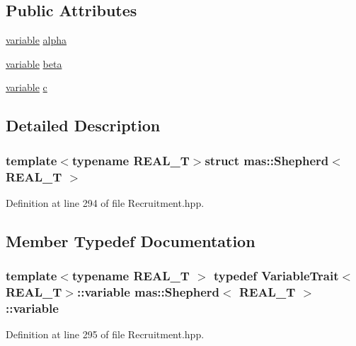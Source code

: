 \subsection*{Public Attributes}
\begin{DoxyCompactItemize}
\item 
\hyperlink{structmas_1_1_shepherd_a5d9d0045570bba5f3450dcedea6a406e}{variable} \hyperlink{structmas_1_1_shepherd_a24f215424f8fe3e38ce0b26fd09628bf}{alpha}
\item 
\hyperlink{structmas_1_1_shepherd_a5d9d0045570bba5f3450dcedea6a406e}{variable} \hyperlink{structmas_1_1_shepherd_a40725fc01050b72af7e0573da6ca2d55}{beta}
\item 
\hyperlink{structmas_1_1_shepherd_a5d9d0045570bba5f3450dcedea6a406e}{variable} \hyperlink{structmas_1_1_shepherd_ab9a9d636240bb7b6b3cea58a85fc5435}{c}
\end{DoxyCompactItemize}


\subsection{Detailed Description}
\subsubsection*{template$<$typename R\-E\-A\-L\-\_\-\-T$>$struct mas\-::\-Shepherd$<$ R\-E\-A\-L\-\_\-\-T $>$}



Definition at line 294 of file Recruitment.\-hpp.



\subsection{Member Typedef Documentation}
\hypertarget{structmas_1_1_shepherd_a5d9d0045570bba5f3450dcedea6a406e}{
\subsubsection[{variable}]{\setlength{\rightskip}{0pt plus 5cm}template$<$typename R\-E\-A\-L\-\_\-\-T $>$ typedef {\bf Variable\-Trait}$<$R\-E\-A\-L\-\_\-\-T$>$\-::{\bf variable} {\bf mas\-::\-Shepherd}$<$ R\-E\-A\-L\-\_\-\-T $>$\-::{\bf variable}}}\label{structmas_1_1_shepherd_a5d9d0045570bba5f3450dcedea6a406e}


Definition at line 295 of file Recruitment.\-hpp.



